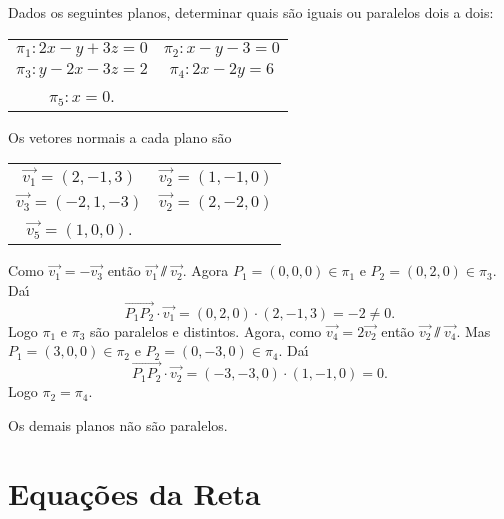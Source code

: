\begin{exemplo}
    Dados os seguintes planos, determinar quais s\~ao iguais ou paralelos dois a dois:
    \begin{center}
        \begin{tabular}{cc}
            $\pi_1 : 2x - y + 3z = 0$ & 
            $\pi_2 : x - y - 3 = 0$\\
            $\pi_3 : y - 2x - 3z = 2$ & $\pi_4 : 2x - 2y = 6$\\
            $\pi_5 : x = 0$.
        \end{tabular}
    \end{center}
    \begin{solucao}
        Os vetores normais a cada plano s\~ao
        \begin{center}
            \begin{tabular}{cc}
                $\vec{v_1} = (2, -1, 3)$ & $\vec{v_2} = (1,-1,0)$\\
                $\vec{v_3} = (-2, 1, -3)$ & $\vec{v_2} = (2,-2,0)$\\
                $\vec{v_5} = (1, 0, 0)$.
            \end{tabular}
        \end{center}
        Como $\vec{v_1} = -\vec{v_3}$ ent\~ao $\vec{v_1}\varparallel\vec{v_2}$. Agora $P_1 = (0,0,0)\in\pi_1$ e $P_2 = (0,2,0)\in\pi_3$. Da{\'\i}
        \[
            \vec{P_1P_2}\cdot\vec{v_1} = (0,2,0)\cdot(2,-1,3) = -2 \ne 0.
        \]
        Logo $\pi_1$ e $\pi_3$ s\~ao paralelos e distintos.
        Agora, como $\vec{v_4} = 2\vec{v_2}$ ent\~ao $\vec{v_2}\varparallel\vec{v_4}$. Mas $P_1 = (3,0,0)\in\pi_2$ e $P_2 = (0,-3,0)\in\pi_4$. Da{\'\i}
        \[
            \vec{P_1P_2}\cdot\vec{v_2} = (-3,-3,0)\cdot(1,-1,0) = 0.
        \]
        Logo $\pi_2 =\pi_4$.

        Os demais planos n\~ao s\~ao paralelos.
    \end{solucao}
\end{exemplo}


\section{Equa\c{c}\~oes da Reta} %
\label{sec:equacoes_da_reta}

